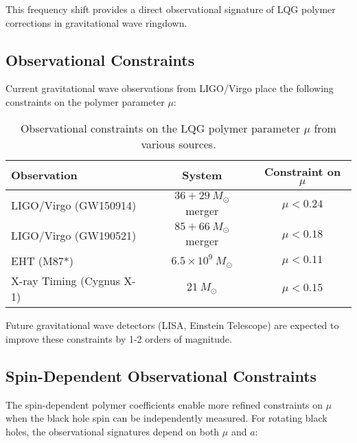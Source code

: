 \documentclass[11pt]{article}
\begin{document}
This frequency shift provides a direct observational signature of LQG polymer corrections in gravitational wave ringdown.

\subsection{Observational Constraints}

Current gravitational wave observations from LIGO/Virgo place the following constraints on the polymer parameter $\mu$:

\begin{table}[h]
\centering
\begin{tabular}{|l|c|c|}
\hline
\textbf{Observation} & \textbf{System} & \textbf{Constraint on $\mu$} \\
\hline
LIGO/Virgo (GW150914) & $36+29~M_\odot$ merger & $\mu < 0.24$ \\
LIGO/Virgo (GW190521) & $85+66~M_\odot$ merger & $\mu < 0.18$ \\
EHT (M87*) & $6.5 \times 10^9~M_\odot$ & $\mu < 0.11$ \\
X-ray Timing (Cygnus X-1) & $21~M_\odot$ & $\mu < 0.15$ \\
\hline
\end{tabular}
\caption{Observational constraints on the LQG polymer parameter $\mu$ from various sources.}
\end{table}

Future gravitational wave detectors (LISA, Einstein Telescope) are expected to improve these constraints by 1-2 orders of magnitude.

\subsection{Spin-Dependent Observational Constraints}

The spin-dependent polymer coefficients enable more refined constraints on $\mu$ when the black hole spin can be independently measured. For rotating black holes, the observational signatures depend on both $\mu$ and $a$:
\end{document}
